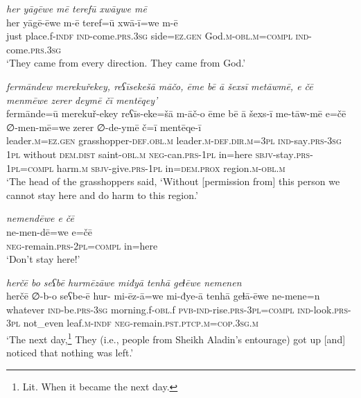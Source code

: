 \ea \label{PM.3}
\textit{her yāgēwe mē terefū xwāywe mē} \\ 
\gll her yāgē-ēwe m-ē teref=ū xwā-ī=we m-ē \\ 
 just place.f\textsc{-indf} \textsc{ind-}come\textsc{.prs}\textsc{.3sg} side\textsc{\textsc{=ez.gen}} God\textsc{.m}\textsc{-obl}\textsc{.m}\textsc{=compl} \textsc{ind-}come\textsc{.prs}\textsc{.3sg} \\ 
\glt `They came from every direction. They came from God.'
\z 
 
\ea \label{PM.5}
\textit{fermāndew merekuřekey, reʕīsekešā māčo, ēme bē ā šexsī metāwmē, e čē menmēwe zerer deymē čī mentēqey’} \\ 
\gll fermānde=ū merekuř-ekey reʕīs-eke=šā m-āč-o ēme bē ā šexs-ī me-tāw-mē e=čē ∅-men-mē=we zerer ∅-de-ymē č=ī mentēqe-ī \\ 
 leader\textsc{.m}\textsc{\textsc{=ez.gen}} grasshopper\textsc{-def}\textsc{.obl}\textsc{.m} leader\textsc{.m}\textsc{-def}\textsc{.dir}\textsc{.m}\textsc{=3pl} \textsc{ind-}say\textsc{.prs}\textsc{-3sg} \textsc{1pl} without \textsc{dem.dist} saint\textsc{-obl}\textsc{.m} \textsc{neg-}can\textsc{.prs}\textsc{-1pl} in=here \textsc{sbjv-}stay\textsc{.prs}\textsc{-1pl}\textsc{=compl} harm\textsc{.m} \textsc{sbjv-}give\textsc{.prs}-\textsc{1pl} in=\textsc{dem.prox} region\textsc{.m}\textsc{-obl}\textsc{.m} \\ 
\glt `The head of the grasshoppers said, ‘Without [permission from] this person we cannot stay here and do harm to this region.'
\z 
 
\ea \label{PM.22}
\textit{nemendēwe e čē} \\ 
\gll ne-men-dē=we e=čē \\ 
 \textsc{neg-}remain\textsc{.prs}-\textsc{2pl}\textsc{=compl} in=here \\ 
\glt `Don’t stay here!'
\z 
 
\ea \label{PM.24}
\textit{herčē bo seʕbē hurmēzāwe miđyā tenhā geɫēwe nemenen} \\ 
\gll herčē ∅-b-o seʕbe-ē hur- mi-ēz-ā=we mi-đye-ā tenhā geɫā-ēwe ne-mene=n \\ 
 whatever \textsc{ind-}be\textsc{.prs}\textsc{-3sg} morning.f\textsc{-obl}.f \textsc{pvb-}\textsc{ind-}rise\textsc{.prs}\textsc{-3pl}\textsc{=compl} \textsc{ind-}look\textsc{.prs}\textsc{-3pl} not\_even leaf\textsc{.m}\textsc{-indf} \textsc{neg-}remain\textsc{.pst}\textsc{.ptcp}\textsc{.m}\textsc{=cop}\textsc{.3sg}\textsc{.m} \\ 
\glt `The next day,\footnote{Lit. When it became the next day.} They (i.e., people from Sheikh Aladin’s entourage) got up [and] noticed that nothing was left.'
\z 
 
